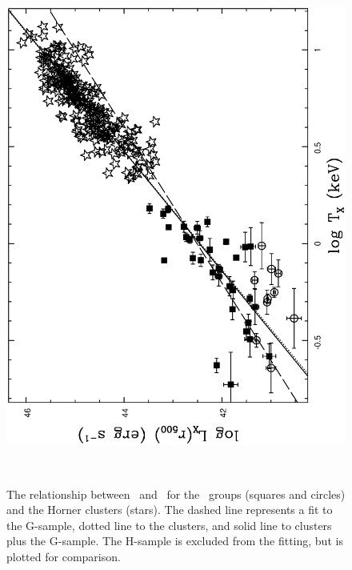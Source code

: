 \documentclass[usenatbib]{mn2e}
\begin{document}
\begin{figure}
\begin{minipage}{241pt}
    \includegraphics[height=\linewidth,angle=270]{fig_13.ps}
    \caption{The relationship between \LXrfh\ and \TX\ for the \GEMS\ groups
             (squares and circles) and the Horner clusters (stars). The dashed
             line represents a fit to the G-sample, dotted line to the
             clusters, and solid line to clusters plus the G-sample.  The
             H-sample is excluded from the fitting, but is plotted for
             comparison.}
    \label{fig_LXrfh_TX_comp}

  \end{minipage}\\
  \begin{minipage}{241pt} 


\end{minipage}
\end{figure}
\end{document}
